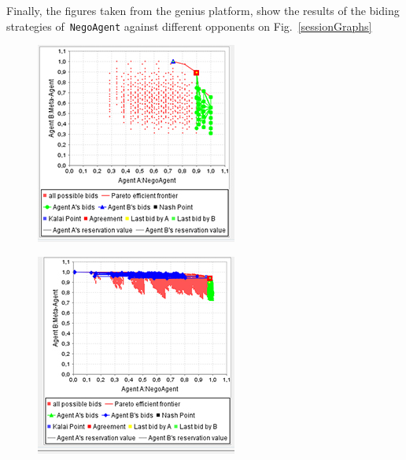 \documentclass[html]{report}    %
\begin{document}
Finally,  the figures taken from the genius platform, show the results of the biding strategies of~\texttt{NegoAgent} against different opponents on Fig.~\ref{sessionGraphs} 
\begin{figure}
\centering
\begin{minipage}{.3\textwidth}
  \centering
  \includegraphics[width=.9\linewidth]{1}
  \label{fig:1}
\end{minipage}%
\begin{minipage}{.3\textwidth}
  \centering
  \includegraphics[width=.9\linewidth]{2}

\end{minipage}
\end{figure}
\end{document}
